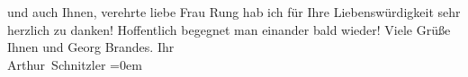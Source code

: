 \begin{ledgroupsized}[t]{13cm}
                    und auch Ihnen, verehrte liebe Frau Rung hab ich für Ihre Liebenswürdigkeit sehr
                    herzlich zu danken!\pend
           \pstart
           Hoffentlich begegnet man einander bald wieder! Viele Grüße Ihnen und Georg Brandes.\pend
           \pstart
           Ihr{\\[\baselineskip]}\spacefill\mbox{Arthur Schnitzler}\pend
           \leftskip=0em{}\endnumbering{}\end{ledgroupsized}  \newcommand{\dateiname}{L02440}\newcommand{\titel}{Arthur Schnitzler an Gertrud Rung, 22. 5. 1925}\newcommand{\editorInnen}{Martin Anton Müller und Gerd-Hermann Susen}
      